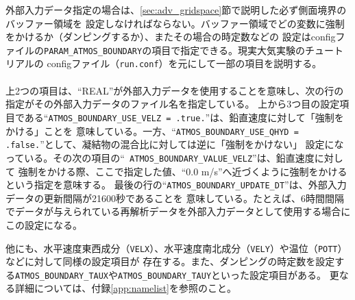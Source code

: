 \noindent 外部入力データ指定の場合は、\ref{sec:adv_gridspace}節で説明した必ず側面境界のバッファー領域を
設定しなければならない。バッファー領域でどの変数に強制をかけるか（ダンピングするか）、またその場合の時定数などの
設定はconfigファイルの\verb|PARAM_ATMOS_BOUNDARY|の項目で指定できる。現実大気実験のチュートリアルの
configファイル（\verb|run.conf|）を元にして一部の項目を説明する。\\

{\small {\gt
{}}}\\

上2つの項目は、``REAL''が外部入力データを使用することを意味し、次の行の指定がその外部入力データのファイル名を指定している。
上から3つ目の設定項目である``\verb|ATMOS_BOUNDARY_USE_VELZ = .true.|''は、鉛直速度に対して「強制をかける」ことを
意味している。一方、``\verb|ATMOS_BOUNDARY_USE_QHYD = .false.|''として、凝結物の混合比に対しては逆に「強制をかけない」
設定になっている。その次の項目の``\verb| ATMOS_BOUNDARY_VALUE_VELZ|''は、鉛直速度に対して
強制をかける際、ここで指定した値、``0.0 m/s''へ近づくように強制をかけるという指定を意味する。
最後の行の``\verb|ATMOS_BOUNDARY_UPDATE_DT|''は、外部入力データの更新間隔が21600秒であることを
意味している。たとえば、6時間間隔でデータが与えられている再解析データを外部入力データとして使用する場合にこの設定になる。

他にも、水平速度東西成分（\verb|VELX|）、水平速度南北成分（\verb|VELY|）や温位（\verb|POTT|）などに対して同様の設定項目が
存在する。また、ダンピングの時定数を設定する\verb|ATMOS_BOUNDARY_TAUX|や\verb|ATMOS_BOUNDARY_TAUY|といった設定項目がある。
更なる詳細については、付録\ref{app:namelist}を参照のこと。


